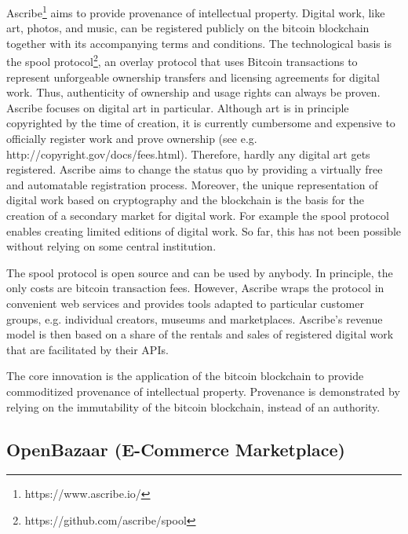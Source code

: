 Ascribe\footnote{https://www.ascribe.io/} aims to provide provenance of intellectual property. Digital work, 
like art, photos, and music, can be registered publicly on the bitcoin blockchain 
together with its accompanying terms and conditions. The technological basis is 
the spool protocol\footnote{https://github.com/ascribe/spool}, an overlay protocol that uses 
Bitcoin transactions to represent unforgeable ownership transfers and licensing 
agreements for digital work. Thus, authenticity of ownership and usage rights can 
always be proven. Ascribe focuses on digital art in particular. Although art is 
in principle copyrighted by the time of creation, it is currently cumbersome and 
expensive to officially register work and prove ownership (see e.g. http://copyright.gov/docs/fees.html). 
Therefore, hardly any digital art gets registered. Ascribe aims to change the status 
quo by providing a virtually free and automatable registration process. Moreover, 
the unique representation of digital work based on cryptography and the blockchain 
is the basis for the creation of a secondary market for digital work. For example 
the spool protocol enables creating limited editions of digital work. So far, this 
has not been possible without relying on some central institution.

The spool protocol is open source and can be used by anybody. In principle, the 
only costs are bitcoin transaction fees. However, Ascribe wraps the protocol in 
convenient web services and provides tools adapted to particular customer groups, 
e.g. individual creators, museums and marketplaces. Ascribe's revenue model is 
then based on a share of the rentals and sales of registered digital work that 
are facilitated by their APIs.

The core innovation is the application of the bitcoin blockchain to provide commoditized 
provenance of intellectual property. Provenance is demonstrated by relying on the 
immutability of the bitcoin blockchain, instead of an authority. 

\subsection{OpenBazaar (E-Commerce Marketplace)}
\label{sec:ecobazaar}

